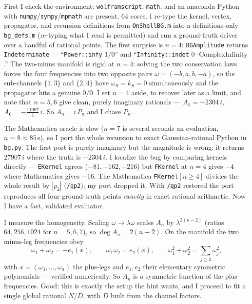 \documentclass{article}
\begin{document}
First I check the environment: \texttt{wolframscript}, \texttt{math}, and an
anaconda Python with \texttt{numpy}/\texttt{sympy}/\texttt{mpmath} are present, 64
cores. I re-type the kernel, vertex, propagator, and recursion definitions from
\texttt{OnShellBG.m} into a definitions-only \texttt{bg\_defs.m} (re-typing what I
read is permitted) and run a ground-truth driver over a handful of rational
points. The first surprise is $n=4$: \texttt{BGAmplitude} returns
\texttt{Indeterminate} --- ``\texttt{Power::infy} $1/0$'' and
``\texttt{Infinity::indet} $0\cdot\text{ComplexInfinity}$.'' The two-minus
manifold is rigid at $n=4$: solving the two conservation laws forces the four
frequencies into two opposite pairs $\omega=(-b,a,b,-a)$, so the sub-channels
$\{1,3\}$ and $\{2,4\}$ have $\omega_S=k_S=0$ simultaneously and the propagator
hits a genuine $0/0$. I set $n=4$ aside, to recover later as a limit, and note
that $n=5,6$ give clean, purely imaginary rationals --- $A_5=-2304\,i$,
$A_6=-\tfrac{11907}{4}\,i$. So $A_n=i\,P_n$ and I chase $P_n$.

The Mathematica oracle is slow ($n=7$ is several seconds an evaluation,
$n=8\approx85$\,s), so I port the whole recursion to exact Gaussian-rational
Python in \texttt{bg.py}. The first port is purely imaginary but the magnitude is
wrong: it returns $27907\,i$ where the truth is $-2304\,i$. I localize the bug by
comparing kernels directly --- \texttt{EKernel} agrees ($-81,-162,-216$) but
\texttt{FKernel} at $n{=}4$ gives $-4$ where Mathematica gives $-16$. The
Mathematica \texttt{FKernel}$[n\ge4]$ divides the whole result by $|p_2|$
(\texttt{/qp2}); my port dropped it. With \texttt{/qp2} restored the port
reproduces all four ground-truth points \emph{exactly} in exact rational
arithmetic. Now I have a fast, validated evaluator.

I measure the homogeneity. Scaling $\omega\to\lambda\omega$ scales $A_n$ by
$\lambda^{2(n-2)}$ (ratios $64,256,1024$ for $n=5,6,7$), so $\deg A_n=2(n-2)$. On
the manifold the two minus-leg frequencies obey
\[
\omega_1+\omega_2=-e_1(x),\qquad \omega_1\omega_2=e_2(x),\qquad
\omega_1^2+\omega_2^2=\sum_{j\ge3}\omega_j^2,
\]
with $x=(\omega_3,\dots,\omega_n)$ the plus-legs and $e_1,e_2$ their elementary
symmetric polynomials --- verified numerically. So $A_n$ is a symmetric function
of the plus-frequencies. Good: this is exactly the setup the hint wants, and I
proceed to fit a single global rational $N/D$, with $D$ built from the channel
factors.
\end{document}
